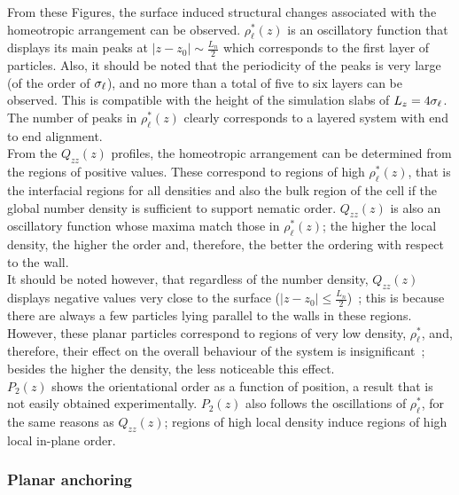 From these Figures, the surface induced structural changes associated with the homeotropic 
arrangement can be
observed. $\rho^{*}_\ell(z)$ is an oscillatory function that displays its main peaks at
$|z-z_0|\sim \frac{L_n}{2}$ which corresponds to the first layer of particles. Also, it should
be noted that the periodicity of the peaks is very large (of the order of $\sigma_\ell$), 
and no more than a total of five to six layers can be observed. 
This is compatible with the height of the simulation slabs of $L_z=4\sigma_\ell$. The number of peaks in 
$\rho^{*}_\ell(z)$ clearly corresponds to a layered system with end to end alignment.\\

From the $Q_{zz}(z)$ profiles, the homeotropic arrangement can be determined from the regions 
of positive values.
These correspond to regions of high $\rho^{*}_\ell(z)$, that is the interfacial
regions for all densities and also the bulk region of the cell if the global number density
is sufficient to support nematic order. $Q_{zz}(z)$ is also an oscillatory function 
whose maxima match those in
$\rho^{*}_\ell(z)$; the higher the local density, the higher the order and, therefore,
the better the ordering with respect to the wall.\\
%
It should be noted however, that regardless of the number density, $Q_{zz}(z)$ displays negative
values very close to the surface ($|z-z_0|\leq \frac{L_n}{2}$)~; this is  because there are
always a few particles lying parallel to the walls in these regions. However, these planar
particles correspond to regions of very low density, $\rho^{*}_\ell$, and, therefore, their
effect on the overall behaviour of the system is insignificant~; besides the higher the density,
the less noticeable this effect.\\

$P_2(z)$ shows the orientational order as a function of position, a result that is not
easily obtained experimentally. $P_2(z)$ also follows the oscillations of
$\rho^{*}_\ell$, for the same reasons as $Q_{zz}(z)$; regions of high local density 
induce regions of high local in-plane order.\\


\subsubsection{Planar anchoring}

